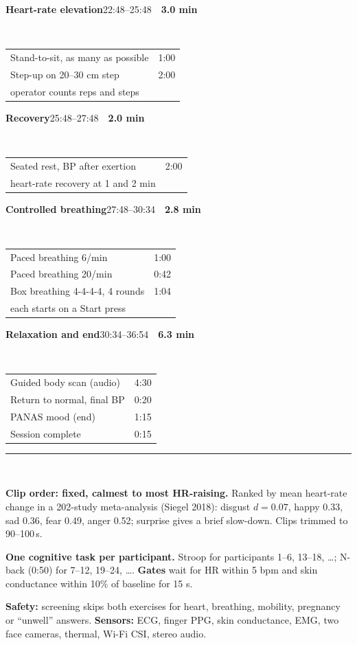 \documentclass[aspectratio=169,10pt]{beamer}
\makeatletter
\newcommand{\card}[5]{%
  \begin{minipage}[t]{0.244\linewidth}
    \colorbox{#1}{\parbox{\dimexpr\linewidth-2\fboxsep}{\color{white}\tiny\textbf{#2}\hfill #3\ \textbar\ \textbf{#4}}}\\[-1pt]
    \tiny\setlength{\tabcolsep}{2pt}\renewcommand{\arraystretch}{0.95}%
    \begin{tabular*}{\linewidth}{@{}l@{\extracolsep{\fill}}r@{}}#5\end{tabular*}
  \end{minipage}}
\makeatother
\begin{document}
\begin{frame}[t]
\vspace{4pt}
\card{clay}{Heart-rate elevation}{22:48--25:48}{3.0 min}{%
  Stand-to-sit, as many as possible & 1:00\\
  Step-up on 20--30 cm step & 2:00\\
  {\color{soft}operator counts reps and steps} & \\}\hfill
\card{clay!70!black}{Recovery}{25:48--27:48}{2.0 min}{%
  Seated rest, BP after exertion & 2:00\\
  {\color{soft}heart-rate recovery at 1 and 2 min} & \\}\hfill
\card{moss}{Controlled breathing}{27:48--30:34}{2.8 min}{%
  Paced breathing 6/min & 1:00\\
  Paced breathing 20/min & 0:42\\
  Box breathing 4-4-4-4, 4 rounds & 1:04\\
  {\color{soft}each starts on a Start press} & \\}\hfill
\card{amber}{Relaxation and end}{30:34--36:54}{6.3 min}{%
  Guided body scan (audio) & 4:30\\
  Return to normal, final BP & 0:20\\
  PANAS mood (end) & 1:15\\
  Session complete & 0:15\\}

\vspace{5pt}
{\color{soft}\rule{\linewidth}{0.3pt}}\\[1pt]
\begin{minipage}[t]{0.33\linewidth}\tiny
\textbf{Clip order: fixed, calmest to most HR-raising.} Ranked by mean heart-rate change in a 202-study meta-analysis
(Siegel 2018): disgust $d{=}0.07$, happy 0.33, sad 0.36, fear 0.49, anger 0.52; surprise gives a brief
slow-down. Clips trimmed to 90--100\,s.
\end{minipage}\hfill
\begin{minipage}[t]{0.31\linewidth}\tiny
\textbf{One cognitive task per participant.} Stroop for participants 1--6, 13--18, \dots; N-back (0:50) for 7--12,
19--24, \dots. \textbf{Gates} wait for HR within 5 bpm and skin conductance within 10\% of baseline for 15 s.
\end{minipage}\hfill
\begin{minipage}[t]{0.33\linewidth}\tiny
\textbf{Safety:} screening skips both exercises for heart, breathing, mobility, pregnancy or ``unwell'' answers.
\textbf{Sensors:} ECG, finger PPG, skin conductance, EMG, two face cameras, thermal, Wi-Fi CSI, stereo audio.
\end{minipage}
\end{frame}
\end{document}
